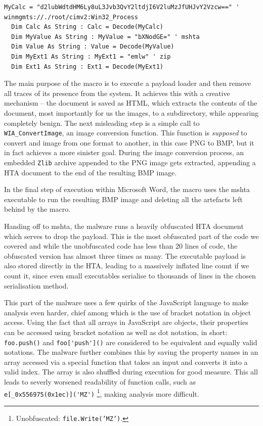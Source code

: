 \begin{lstlisting}[language=VBScript, caption={Encoded strings in the macro}]
  MyCalc = "d2lubWdtdHM6Ly8uL3Jvb3QvY2ltdjI6V2luMzJfUHJvY2Vzcw==" ' winmgmts://./root/cimv2:Win32_Process
  Dim Calc As String : Calc = Decode(MyCalc)
  Dim MyValue As String : MyValue = "bXNodGE=" ' mshta
  Dim Value As String : Value = Decode(MyValue)
  Dim MyExt1 As String : MyExt1 = "emlw" ' zip
  Dim Ext1 As String : Ext1 = Decode(MyExt1)
\end{lstlisting}

The main purpose of the macro is to execute a payload loader and then remove all traces of its presence from the system.
It achieves this with a creative mechanism -- the document is saved as \acrshort{HTML}, which extracts the contents of the
document, most importantly for us the images, to a subdirectory, while appearing completely benign. The next misleading
step is a simple call to \verb+WIA_ConvertImage+, an image conversion function. This function is \emph{supposed} to
convert and image from one format to another, in this case \acrshort{PNG} to \acrshort{BMP}, but it in fact achieves a
more sinister goal. During the image conversion process, an embedded \verb+Zlib+ archive appended to the \acrshort{PNG}
image gets extracted, appending a \acrfull{HTA} document to the end of the resulting \acrshort{BMP} image.

In the final step of execution within Microsoft Word, the macro uses the \acrfull{mshta} executable to run the resulting
\acrshort{BMP} image and deleting all the artefacts left behind by the macro.

Handing off to \acrshort{mshta}, the malware runs a heavily obfuscated \acrshort{HTA} document which serves to drop the
payload. This is the most obfuscated part of the code we covered and while the unobfuscated code has less than 20 lines
of code, the obfuscated version has almost three times as many. The executable payload is also stored directly in the
\acrshort{HTA}, leading to a massively inflated line count if we count it, since even small executables serialise to
thousands of lines in the chosen serialisation method. 

This part of the malware uses a few quirks of the JavaScript language to make analysis even harder, chief among which is
the use of bracket notation in object access. Using the fact that all arrays in JavaScript are objects, their properties
can be accessed using bracket notation as well as dot notation, in short: \verb+foo.push()+ and \verb+foo['push']()+ are 
considered to be equivalent and equally valid notations. 
The malware further combines this by saving the property names in an array accessed via a special function that takes an 
input and converts it into a valid index. The array is also shuffled during execution for good measure. This all leads to 
severly worsened readability of function calls, such as \verb+e[_0x556975(0x1ec)]('MZ')+
\footnote{Unobfuscated: \texttt{file.Write('MZ')}.}, making analysis more difficult. %

